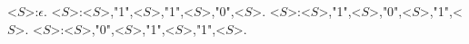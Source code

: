 <$S$>:$\epsilon$.
<$S$>:<$S$>,"1",<$S$>,"1",<$S$>,"0",<$S$>.
<$S$>:<$S$>,"1",<$S$>,"0",<$S$>,"1",<$S$>.
<$S$>:<$S$>,"0",<$S$>,"1",<$S$>,"1",<$S$>.